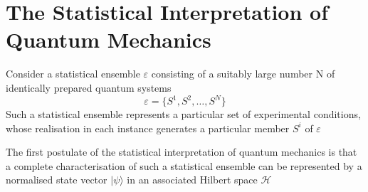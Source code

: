 \section{The Statistical Interpretation of Quantum Mechanics\cite{Breuer2002}}
Consider a statistical ensemble $\varepsilon$ consisting of a suitably large number N of identically prepared quantum systems
\begin{equation}
  \varepsilon = \{S^1, S^2, \ldots, S^N\}
\end{equation}
Such a statistical ensemble represents a particular set of experimental conditions, whose realisation in each instance generates a particular member $S^i$ of  $\varepsilon$

The first postulate of the statistical interpretation of quantum mechanics is that a complete characterisation of such a statistical ensemble can be represented by a normalised state vector $| \psi \rangle$ in an associated Hilbert space $\mathcal{H}$

